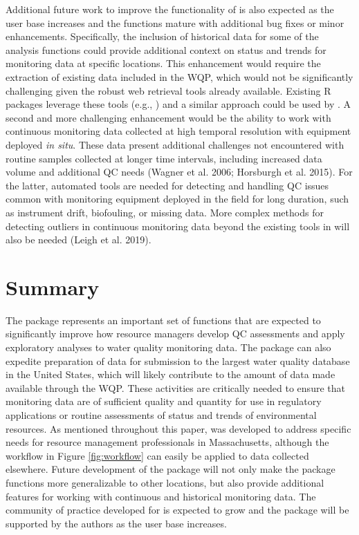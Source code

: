 Additional future work to improve the functionality of  is also expected as the user base increases and the functions mature with additional bug fixes or minor enhancements. Specifically, the inclusion of historical data for some of the analysis functions could provide additional context on status and trends for monitoring data at specific locations. This enhancement would require the extraction of existing data included in the WQP, which would not be significantly challenging given the robust web retrieval tools already available. Existing R packages leverage these tools (e.g., ) and a similar approach could be used by . A second and more challenging enhancement would be the ability to work with continuous monitoring data collected at high temporal resolution with equipment deployed \emph{in situ}. These data present additional challenges not encountered with routine samples collected at longer time intervals, including increased data volume and additional QC needs (Wagner et al. 2006; Horsburgh et al. 2015). For the latter, automated tools are needed for detecting and handling QC issues common with monitoring equipment deployed in the field for long duration, such as instrument drift, biofouling, or missing data. More complex methods for detecting outliers in continuous monitoring data beyond the existing tools in  will also be needed (Leigh et al. 2019).

\hypertarget{summary}{%
\section{Summary}\label{summary}}

The  package represents an important set of functions that are expected to significantly improve how resource managers develop QC assessments and apply exploratory analyses to water quality monitoring data. The package can also expedite preparation of data for submission to the largest water quality database in the United States, which will likely contribute to the amount of data made available through the WQP. These activities are critically needed to ensure that monitoring data are of sufficient quality and quantity for use in regulatory applications or routine assessments of status and trends of environmental resources. As mentioned throughout this paper,  was developed to address specific needs for resource management professionals in Massachusetts, although the workflow in Figure \ref{fig:workflow} can easily be applied to data collected elsewhere. Future development of the package will not only make the package functions more generalizable to other locations, but also provide additional features for working with continuous and historical monitoring data. The community of practice developed for  is expected to grow and the package will be supported by the authors as the user base increases.

